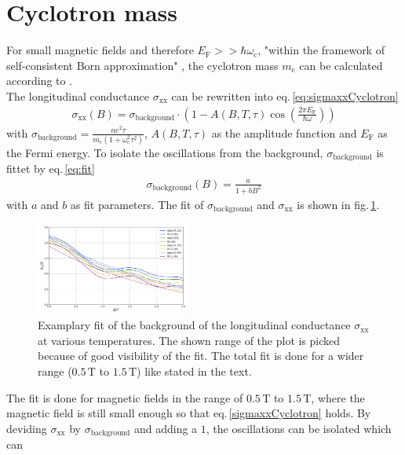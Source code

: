 \section{Cyclotron mass}
For small magnetic fields and therefore $E_\text{F}>>\hbar\omega_\text{c}$, "within the framework of self-consistent Born approximation" \cite{Tasksheet}, 
the cyclotron mass $m_\text{c}$ can be calculated according to \cite{Ando}.\\
The longitudinal conductance $\sigma_\text{xx}$ \cite{Ando} can be rewritten into eq.\,\ref{eq:sigmaxxCyclotron}
\begin{align}
    \sigma_\text{xx}(B) = \sigma_\text{background}\cdot\left(1-A(B,T,\tau)\cos{\left(\frac{2\pi E_\text{F}}{\hbar\omega}\right)}\right)
    \label{sigmaxxCyclotron}
\end{align}
with $\sigma_\text{background}=\frac{ne^2\tau}{m_\text{c}(1+\omega_\text{c}^2\tau^2)}$, $A(B,T,\tau)$ as the amplitude function and $E_\text{F}$ as the Fermi energy. 
To isolate the oscillations from the background, $\sigma_\text{background}$ is fittet by eq.\,\ref{eq:fit}
\begin{align}
    \sigma_\text{background}(B) = \frac{a}{1+bB^2}
    \label{eq:fit}
\end{align}
with $a$ and $b$ as fit parameters. The fit of $\sigma_\text{background}$ and $\sigma_\text{xx}$ is shown in fig.\,\ref{fig:fitCyclotron}.
\begin{figure}[h]
    \centering
    \includegraphics[width=0.45\textwidth]{../Images/sigmaWithFit.png}
    \caption{Examplary fit of the background of the longitudinal conductance $\sigma_\text{xx}$ at various temperatures. 
    The shown range of the plot is picked because of good visibility of the fit. The total fit is done for a wider range ($0.5\,\text{T}$ to $1.5\,\text{T}$) like stated in the text.}
    \label{fig:fitCyclotron}
\end{figure}
The fit is done for magnetic fields in the range of $0.5\,\text{T}$ to $1.5\,\text{T}$, 
where the magnetic field is still small enough so that eq.\,\ref{sigmaxxCyclotron} holds.
By deviding $\sigma_\text{xx}$ by $\sigma_\text{background}$ and adding a $1$, the oscillations can be isolated which can
